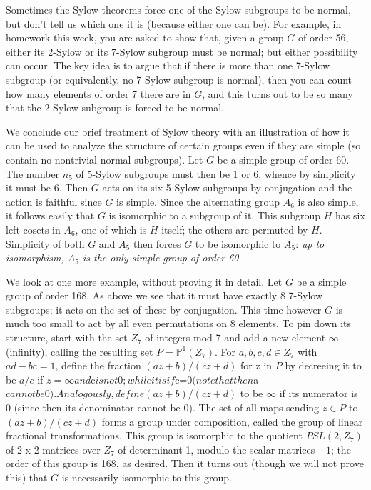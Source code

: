 Sometimes the Sylow theorems force one of the Sylow subgroups to be normal, but don't tell us which one it is (because either one can be).  For example, in homework this week, you are asked to show that, given a group $G$ of order 56, either its 2-Sylow or its 7-Sylow subgroup must be normal; but either possibility can occur.  The key idea is to argue that if there is more than one 7-Sylow subgroup (or equivalently, no 7-Sylow subgroup is normal), then you can count how many elements of order 7 there are in $G$, and this turns out to be so many that the 2-Sylow subgroup is forced to be normal.  

We conclude our brief treatment of Sylow theory with an illustration of how it can be used to analyze the structure of certain groups even if they are simple (so contain no nontrivial normal subgroups).  Let $G$ be a simple group of order 60.  The number $n_5$ of 5-Sylow subgroups must then be 1 or 6, whence by simplicity it must be 6.  Then $G$ acts on its six 5-Sylow subgroups by conjugation and the action is faithful since $G$ is simple.  Since the alternating group $A_6$ is also simple, it follows easily that $G$ is isomorphic to a subgroup of it.  This subgroup $H$ has six left cosets in $A_6$, one of which is $H$ itself; the others are permuted by $H$.  Simplicity of both $G$ and $A_5$ then forces $G$ to be isomorphic to $A_5$:  {\sl up to isomorphism, $A_5$ is the only simple group of order 60}.

We look at one more example, without proving it in detail.  Let $G$ be a simple group of order 168.  As above we see that it must have exactly 8 7-Sylow subgroups; it acts on the set of these by conjugation.  This time however $G$ is much too small to act by all even permutations on 8 elements.  To pin down its structure, start with the set $Z_7$ of integers mod 7 and add a new element $\infty$ (infinity), calling the resulting set $P=\mathbb P^1(Z_7)$.  For $a,b,c,d\in Z_7$ with $ad-bc=1$, define
the fraction $(az + b)/(cz + d)$ for z in $P$ by decreeing it to be $a/c$ if $z=\infty and $c$ is not 0; while it is $\infty$ if $c=0$ (note that then $a$ cannot be 0).  Analogously, define (az+b)/(cz+d)$ to be $\infty$ if its numerator is 0 (since then its denominator cannot be 0).  The set of all maps sending 
$z\in P$ to $(az+b)/(cz+d)$ forms a group under composition, called the group of linear fractional transformations.  This group is isomorphic to the quotient $PSL(2,Z_7)$ of 2 x 2 matrices over $Z_7$ of determinant 1, modulo the scalar matrices $\pm1$; the order of this group is 168, as desired.  Then it turns out (though we will not prove this) that $G$ is necessarily isomorphic to this group.
